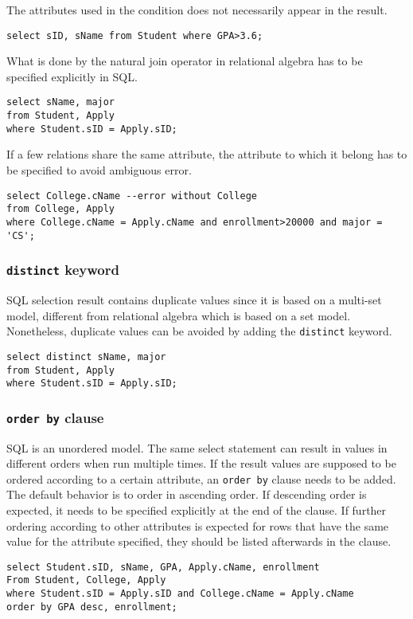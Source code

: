 The attributes used in the condition does not necessarily appear in the result.
\begin{lstlisting}
select sID, sName from Student where GPA>3.6;
\end{lstlisting}
What is done by the natural join operator in relational algebra has to be specified explicitly in SQL.
\begin{lstlisting}
select sName, major 
from Student, Apply 
where Student.sID = Apply.sID;
\end{lstlisting}
If a few relations share the same attribute, the attribute to which it belong has to be specified to avoid ambiguous error.
\begin{lstlisting}
select College.cName --error without College
from College, Apply 
where College.cName = Apply.cName and enrollment>20000 and major = 'CS';
\end{lstlisting}
\subsubsection{\texttt{distinct} keyword}
SQL selection result contains duplicate values since it is based on a multi-set model, different from relational algebra which is based on a set model. Nonetheless, duplicate values can be avoided by adding the \texttt{distinct} keyword.
\begin{lstlisting}
select distinct sName, major 
from Student, Apply 
where Student.sID = Apply.sID;
\end{lstlisting}
\subsubsection{\texttt{order by} clause}
SQL is an unordered model. The same select statement can result in values in different orders when run multiple times. If the result values are supposed to be ordered according to a certain attribute, an \texttt{order by} clause needs to be added. The default behavior is to order in ascending order. If descending order is expected, it needs to be specified explicitly at the end of the clause. If further ordering according to other attributes is expected for rows that have the same value for the attribute specified, they should be listed afterwards in the clause. 
\begin{lstlisting}
select Student.sID, sName, GPA, Apply.cName, enrollment
From Student, College, Apply
where Student.sID = Apply.sID and College.cName = Apply.cName
order by GPA desc, enrollment;
\end{lstlisting}
